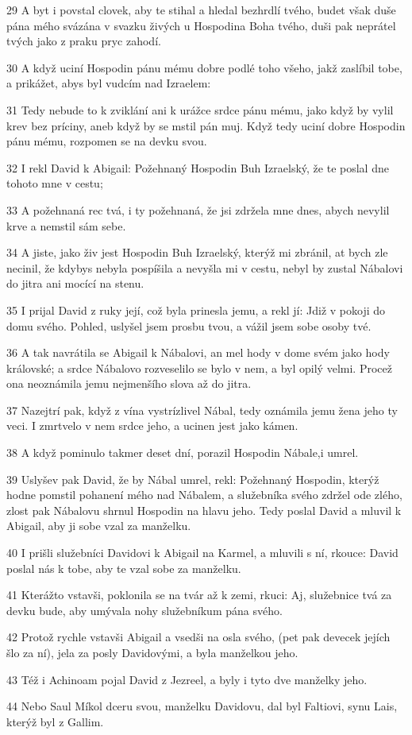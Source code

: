 \par 29 A byt i povstal clovek, aby te stihal a hledal bezhrdlí tvého, budet však duše pána mého svázána v svazku živých u Hospodina Boha tvého, duši pak neprátel tvých jako z praku pryc zahodí.
\par 30 A když uciní Hospodin pánu mému dobre podlé toho všeho, jakž zaslíbil tobe, a prikážet, abys byl vudcím nad Izraelem:
\par 31 Tedy nebude to k zviklání ani k urážce srdce pánu mému, jako když by vylil krev bez príciny, aneb když by se mstil pán muj. Když tedy uciní dobre Hospodin pánu mému, rozpomen se na devku svou.
\par 32 I rekl David k Abigail: Požehnaný Hospodin Buh Izraelský, že te poslal dne tohoto mne v cestu;
\par 33 A požehnaná rec tvá, i ty požehnaná, že jsi zdržela mne dnes, abych nevylil krve a nemstil sám sebe.
\par 34 A jiste, jako živ jest Hospodin Buh Izraelský, kterýž mi zbránil, at bych zle necinil, že kdybys nebyla pospíšila a nevyšla mi v cestu, nebyl by zustal Nábalovi do jitra ani mocící na stenu.
\par 35 I prijal David z ruky její, což byla prinesla jemu, a rekl jí: Jdiž v pokoji do domu svého. Pohled, uslyšel jsem prosbu tvou, a vážil jsem sobe osoby tvé.
\par 36 A tak navrátila se Abigail k Nábalovi, an mel hody v dome svém jako hody královské; a srdce Nábalovo rozveselilo se bylo v nem, a byl opilý velmi. Procež ona neoznámila jemu nejmenšího slova až do jitra.
\par 37 Nazejtrí pak, když z vína vystrízlivel Nábal, tedy oznámila jemu žena jeho ty veci. I zmrtvelo v nem srdce jeho, a ucinen jest jako kámen.
\par 38 A když pominulo takmer deset dní, porazil Hospodin Nábale,i umrel.
\par 39 Uslyšev pak David, že by Nábal umrel, rekl: Požehnaný Hospodin, kterýž hodne pomstil pohanení mého nad Nábalem, a služebníka svého zdržel ode zlého, zlost pak Nábalovu shrnul Hospodin na hlavu jeho. Tedy poslal David a mluvil k Abigail, aby ji sobe vzal za manželku.
\par 40 I prišli služebníci Davidovi k Abigail na Karmel, a mluvili s ní, rkouce: David poslal nás k tobe, aby te vzal sobe za manželku.
\par 41 Kterážto vstavši, poklonila se na tvár až k zemi, rkuci: Aj, služebnice tvá za devku bude, aby umývala nohy služebníkum pána svého.
\par 42 Protož rychle vstavši Abigail a vsedši na osla svého, (pet pak devecek jejích šlo za ní), jela za posly Davidovými, a byla manželkou jeho.
\par 43 Též i Achinoam pojal David z Jezreel, a byly i tyto dve manželky jeho.
\par 44 Nebo Saul Míkol dceru svou, manželku Davidovu, dal byl Faltiovi, synu Lais, kterýž byl z Gallim.

